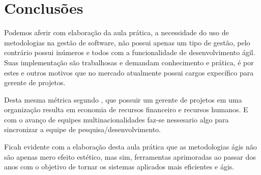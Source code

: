 






\section{Conclusões}

\par Podemos aferir com elaboração da aula prática, a necessidade do uso de metodologias na gestão de software, não possui apenas um tipo de gestão, pelo contrário possui inúmeros e todos com a funcionalidade de desenvolvimento ágil. Suas implementação são trabalhosas e demandam conhecimento e prática, é por estes e outros motivos que no mercado atualmente possui cargos expecífico para gerente de projetos.
\par Desta mesma métrica segundo , que possuir um gerente de projetos em uma organização resulta em economia de recursos financeiro e recursos humanos. E com o avanço de equipes multinacionalidades faz-se nessesario algo para sincronizar a equipe de pesquisa/desenvolvimento.
\par Ficah evidente com a elaboração desta aula prática que as metodologias ágis não são apenas mero efeito estético, mas sim, ferramentas aprimoradas ao passar dos anos com o objetivo de tornar os sistemas aplicados mais eficientes e ágis. 




